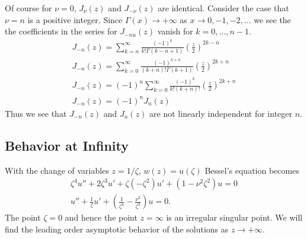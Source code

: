 Of course for $\nu = 0$, $J_\nu(z)$ and $J_{-\nu}(z)$ are identical.
Consider the case that $\nu = n$ is a positive integer.  Since 
$\Gamma(x) \to +\infty$ as $x \to 0, -1, -2, \ldots$ we see the the 
coefficients in the series for $J_{-nu}(z)$ vanish for 
$k = 0, \ldots, n-1$.
\begin{gather*}
  J_{-n}(z) = \sum_{k = n}^\infty \frac{ (-1)^k }{ k! \Gamma(k - n + 1) }
  \left( \frac{z}{2} \right)^{2 k - n} \\
  J_{-n}(z) = \sum_{k = 0}^\infty \frac{ (-1)^{k+n} }{ (k+n)! \Gamma(k + 1) }
  \left( \frac{z}{2} \right)^{2 k + n} \\
  J_{-n}(z) = (-1)^n \sum_{k = 0}^\infty \frac{ (-1)^k }{ k! (k+n)! }
  \left( \frac{z}{2} \right)^{2 k + n} \\
  J_{-n}(z) = (-1)^n J_n(z)
\end{gather*}
Thus we see that $J_{-n}(z)$ and $J_n(z)$ are not linearly independent 
for integer $n$.






\subsection{Behavior at Infinity}



With the change of variables $z = 1/\zeta$, $w(z) = u(\zeta)$ Bessel's equation
becomes
\begin{gather*}
  \zeta^4 u'' + 2 \zeta^3 u' + \zeta \left( - \zeta^2 \right) u'+ \left( 1 - \nu^2 \zeta^2 \right) u = 0 
  \\
  u'' + \frac{1}{\zeta} u' + \left(\frac{1}{\zeta^4} - \frac{\nu^2}{\zeta^2}\right)u = 0.
\end{gather*}
The point $\zeta = 0$ and hence the point $z = \infty$ is an irregular singular
point.  We will find the leading order asymptotic behavior of the solutions
as $z \to +\infty$.


